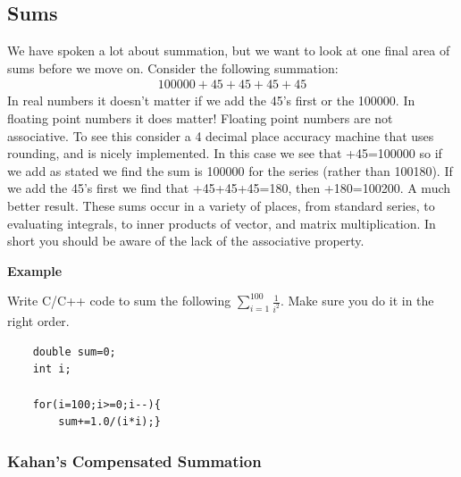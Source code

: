 \subsection{Sums}
We have spoken a lot about summation, but we want to look at one final
area of sums before we move on.  Consider the following summation:
\begin{eqnarray}
100000+45+45+45+45
\end{eqnarray}
In real numbers it doesn't matter if we add the 45's first or the 100000.
In floating point numbers it does matter!  Floating point numbers are not
associative.  To see this consider a 4 decimal place accuracy machine that
uses rounding, and is nicely implemented.  In this case we see that
+45=100000
\eeqn
so if we add as stated we find the sum is 100000 for the series (rather
than 100180).  If we add the 45's first we find that
+45+45+45=180,
\eeqn
then
+180=100200.
\eeqn
A much better result.  These sums occur in a variety of places, from
standard series, to evaluating integrals, to inner products of vector, and
matrix multiplication.  In short you should be aware of the lack of the
associative property.


\vspace{.1in}\noindent
\textbf{Example}

Write C/C++ code to sum the following $\sum_{i=1}^{100}\frac{1}{i^2}$.  Make sure you do it in the right order.
    {\color{ans}

    \begin{verbatim}
    double sum=0;
    int i;

    for(i=100;i>=0;i--){
        sum+=1.0/(i*i);}
    \end{verbatim}

    }

\subsubsection{Kahan's Compensated Summation}

